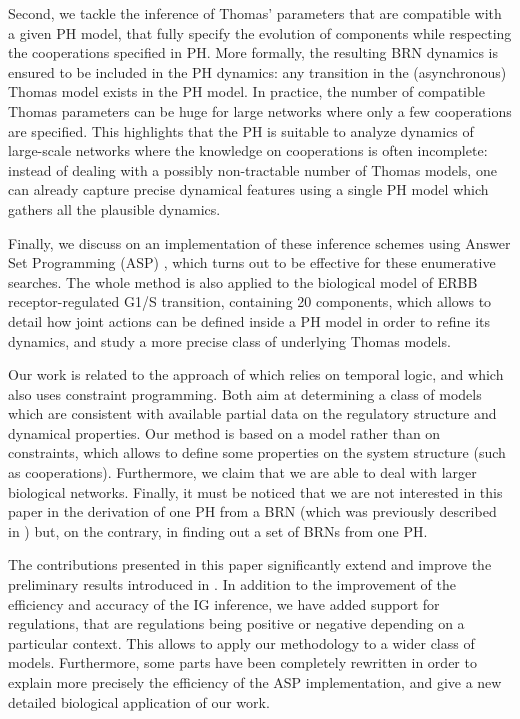 Second, we tackle the inference of Thomas' parameters that are compatible with a given PH
model, \ie that fully specify the evolution of components while respecting the cooperations
specified in PH.
More formally, the resulting BRN dynamics is ensured to be included in the PH dynamics: any
transition in the (asynchronous) Thomas model exists in the PH model.
In practice, the number of compatible Thomas parameters can be huge for large networks where only a
few cooperations are specified.
This highlights that the PH is suitable to analyze dynamics of large-scale networks
where the knowledge on cooperations is often incomplete:
instead of dealing with a possibly non-tractable number of Thomas models, one can already capture
precise dynamical features using a single PH model which gathers all the plausible dynamics.

Finally, we discuss on an implementation of these inference schemes using Answer Set
Programming (ASP) \cite{Baral03},  which turns out to be effective for these enumerative searches.
The whole method is also applied to the biological model of ERBB receptor-regulated G1/S transition,
containing 20 components,
which allows to detail how joint actions can be defined inside a PH model in order
to refine its dynamics, and study a more precise class of underlying Thomas models.

Our work is related to the approach of \cite{Khalis09} which relies on temporal logic, and \cite{20646302,DBLP:conf/ipcat/CorblinFTCT12} which also uses constraint programming.
Both aim at determining a class of models which are consistent with available partial data on the regulatory structure and dynamical properties.
Our method is based on a model rather than on constraints, which allows to define some properties on the system structure (such as cooperations).
Furthermore, we claim that we are able to deal with larger biological networks.
Finally, it must be noticed that we are not interested in this paper in the derivation of one PH
from a BRN (which was previously described in \cite{PMR10-TCSB}) but, on the contrary, in finding
out a set of BRNs from one PH.

The contributions presented in this paper significantly extend and improve the preliminary results
introduced in \cite{FPIMR12-CMSB}.
In addition to the improvement of the efficiency and accuracy of the IG inference, we have added support for
 regulations, that are regulations being positive or negative depending on a particular
context.
This allows to apply our methodology to a wider class of models.
Furthermore, some parts have been completely rewritten in order to explain more precisely the efficiency of the ASP implementation,
and give a new detailed biological application of our work.

